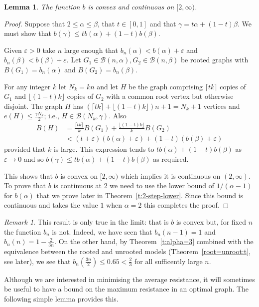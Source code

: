 \documentclass[11pt]{article}
\newtheorem{lemma}[theorem]{Lemma}
\theoremstyle{remark}
\newtheorem*{remark}{Remark}
\def\a{\alpha}
\def\b{\beta}
\def\e{\varepsilon}
\def\cB{\mathcal{B}}
\begin{document}
\begin{lemma}\label{convex:lem}
The function $b$ is convex and continuous on $[2,\infty)$.
\end{lemma}
\begin{proof}
Suppose that $2\leq\a\leq\b$, that $t\in[0,1]$ and that
$\gamma=t\a+(1-t)\b$. We must show that $b(\gamma)\leq
tb(\a)+(1-t)b(\b)$.

Given $\e>0$ take $n$ large enough that $b_n(\a)<b(\a)+\e$ and
$b_n(\b)<b(\b)+\e$. Let $G_1\in\cB(n,\a),G_2\in\cB(n,\b)$ be rooted graphs with
$B(G_1)=b_n(\a)$ and $B(G_2)=b_n(\b)$.

For any integer $k$ let $N_k=kn$ and let $H$ be the graph comprising
$\lceil tk\rceil$ copies of $G_1$ and $\lfloor(1-t)k\rfloor$ copies of
$G_2$ with a common root vertex but otherwise disjoint. The graph $H$
has $(\lceil tk\rceil+\lfloor(1-t)k\rfloor)n+1=N_k+1$ vertices and
$e(H)\leq\frac{\gamma N_k}{2}$; i.e., $H\in \cB(N_k,\gamma)$. Also
\begin{align*}
B(H)&=\frac{\lceil
  tk\rceil}{k}B(G_1)+\frac{\lfloor(1-t)k\rfloor}{k}B(G_2)\\ 
&<(t+\e)(b(\a)+\e)+(1-t)(b(\b)+\e)
\end{align*}
provided that $k$ is large. This expression tends to
$tb(\a)+(1-t)b(\b)$ as $\e\rightarrow0$ and so $b(\gamma)\leq
tb(\a)+(1-t)b(\b)$ as required.

This shows that $b$ is convex on $[2,\infty)$ which implies it is
continuous on $(2,\infty)$. To prove that $b$ is continuous at $2$ we
need to use the lower bound of $1/(\a-1)$ for $b(\a)$ that we prove
later in Theorem~\ref{t:2-step-lower}. Since this bound is continuous
and takes the value $1$ when $\a=2$ this completes the proof.
\end{proof}
\begin{remark}
  This result is only true in the limit: that is $b$ is convex but,
  for fixed $n$ the function $b_n$ is not. Indeed, we have seen that
  $b_n(n-1)=1$ and $b_n(n)=1-\frac{2}{3n}$. On the other hand, by
  Theorem~\ref{t:alpha=3} combined with the equivalence between the
  rooted and unrooted models (Theorem~\ref{root=unroot:t}, see later),
  we see that $b_n(\frac{3n}{2})\le 0.65<\frac23$ for all sufficently large
  $n$.
\end{remark}


Although we are interested in minimising the average resistance, it
will sometimes be useful to have a bound on the maximum resistance in
an optimal graph. The following simple lemma provides this.
\end{document}
